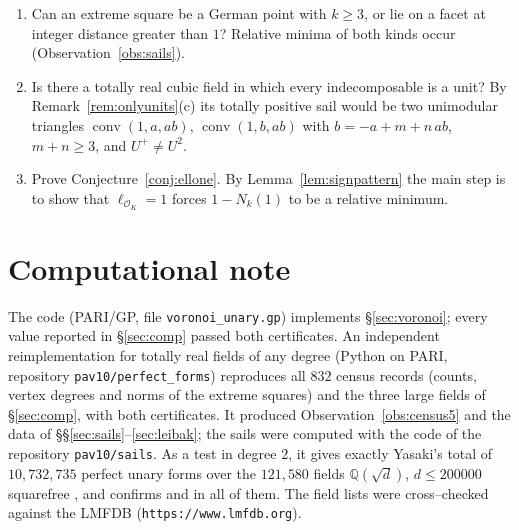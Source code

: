 \documentclass[11pt,reqno]{amsart}
\theoremstyle{plain}
\theoremstyle{definition}
\newcommand{\Q}{\mathbb{Q}}
\newcommand{\conv}{\operatorname{conv}}
\newcommand{\nK}{n_K}
\begin{document}
\begin{enumerate}[label=\textup{(\arabic*)},leftmargin=2.2em]
$\nK=3$ does not occur for $D\le10^5$.
\item Can an extreme square be a German point with $k\ge3$, or lie on a facet at integer distance greater
than $1$? Relative minima of both kinds occur (Observation~\ref{obs:sails}).
\item Is there a totally real cubic field in which every indecomposable is a unit? By
Remark~\ref{rem:onlyunits}(c) its totally positive sail would be two unimodular triangles
$\conv(1,a,ab)$, $\conv(1,b,ab)$ with $b=-a+m+n\,ab$, $m+n\ge3$, and $U^+\ne U^2$.
\item Prove Conjecture~\ref{conj:ellone}. By Lemma~\ref{lem:signpattern} the main step is to show that
$\ell_{\mathcal O_K}=1$ forces $1-N_k(1)$ to be a relative minimum.
\end{enumerate}

\section*{Computational note}
The code (PARI/GP, file \texttt{voronoi\_unary.gp}) implements \S\ref{sec:voronoi}; every value reported in
\S\ref{sec:comp} passed both certificates. An independent reimplementation for totally real fields of any
degree (Python on PARI, repository \texttt{pav10/perfect\_forms}) reproduces all $832$ census records
(counts, vertex degrees and norms of the extreme squares) and the three large fields of
\S\ref{sec:comp}, with both certificates. It produced Observation~\ref{obs:census5} and the data of
\S\S\ref{sec:sails}--\ref{sec:leibak}; the sails were computed with the code of the repository
\texttt{pav10/sails}. As a test in degree $2$, it gives exactly Yasaki's total of $10{,}732{,}735$ perfect
unary forms over the $121{,}580$ fields $\Q(\sqrt d)$, $d\le200000$ squarefree \cite[\S4]{Yasaki}, and
confirms \cite[Thm.~5.1]{Yasaki} and \cite[Thm.~1.2]{LPL} in all of them. The field lists were
cross--checked against the LMFDB (\texttt{https://www.lmfdb.org}).
\end{document}
